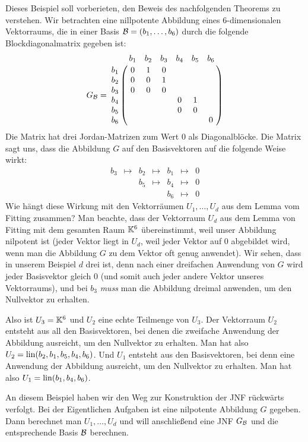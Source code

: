 \begin{bsp} Dieses Beispiel soll vorberieten, den Beweis des nachfolgenden Theorems zu verstehen. 
	Wir betrachten eine nillpotente Abbildung eines $6$-dimensionalen Vektorraums, die in einer Basis $ \mathcal{B} = (b_1, \ldots, b_6) $ durch die folgende Blockdiagonalmatrix gegeben ist: 
	\begin{equation*}
		G_\B = \bordermatrix{
			& b_1 & b_2 & b_3 & b_4 & b_5 & b_6 \cr
			b_1 &0&1&0&&& \cr
			b_2 &0&0&1&&& \cr
			b_3 &0&0&0&&& \cr
			b_4 &&&&0&1& \cr
			b_5 &&&&0&0& \cr
			b_6 &&&&&&0
		}
	\end{equation*}
	Die Matrix hat drei Jordan-Matrizen zum Wert $0$ als Diagonalblöcke. 
	Die Matrix sagt uns, dass die Abbildung $G$ auf den Basisvektoren auf die folgende Weise wirkt: 
	\begin{equation*}
		\begin{array}{ccccccc}
			b_3 & \mapsto & b_2 & \mapsto & b_1 & \mapsto & 0
			\\ && b_5 & \mapsto & b_4 & \mapsto & 0
			\\ && & & b_6 & \mapsto & 0
		\end{array}
	\end{equation*}
	Wie hängt diese Wirkung mit den Vektorräumen $U_1,\ldots,U_d$ aus dem Lemma vom Fitting zusammen? Man beachte, dass der Vektorraum $U_d$ aus dem Lemma von Fitting mit dem gesamten Raum $\mathbb K^6$ übereinstimmt, weil unser Abbildung nilpotent ist (jeder Vektor liegt in $U_d$, weil jeder Vektor auf $0$ abgebildet wird, wenn man die Abbildung $G$ zu dem Vektor oft genug anwendet). Wir sehen, dass in unserem Beispiel $d$ drei ist, denn nach einer dreifachen Anwendung von $G$ wird jeder Basisvektor gleich $0$ (und somit auch jeder andere Vektor unseres Vektorraums), und bei $b_3$ \emph{muss} man die Abbildung dreimal anwenden, um den Nullvektor zu erhalten. 
	
	Also ist $U_3 = \mathbb K^6$ und $U_2$ eine echte Teilmenge von $U_3$. Der Vektorraum $U_2$ entsteht aus all den Basisvektoren, bei denen die zweifache Anwendung der Abbildung ausreicht, um den Nullvektor zu erhalten. Man hat also $U_2 = \operatorname{lin}(b_2,b_1,b_5,b_4,b_6)$. Und $U_1$ entsteht aus den Basisvektoren, bei denn eine Anwendung der Abbildung ausreicht, um den Nullvektor zu erhalten. Man hat also $U_1 = \operatorname{lin}(b_1, b_4, b_6)$. 
	
	An diesem Beispiel haben wir den Weg zur Konstruktion der JNF rückwärts verfolgt. Bei der Eigentlichen Aufgaben ist eine nilpotente Abbildung $G$ gegeben. Dann berechnet man $U_1,\ldots,U_d$ und will anschließend eine JNF  $G_{\mathcal{B}}$ und die entsprechende Basis $\mathcal{B}$ berechnen. 
	

\end{bsp}

